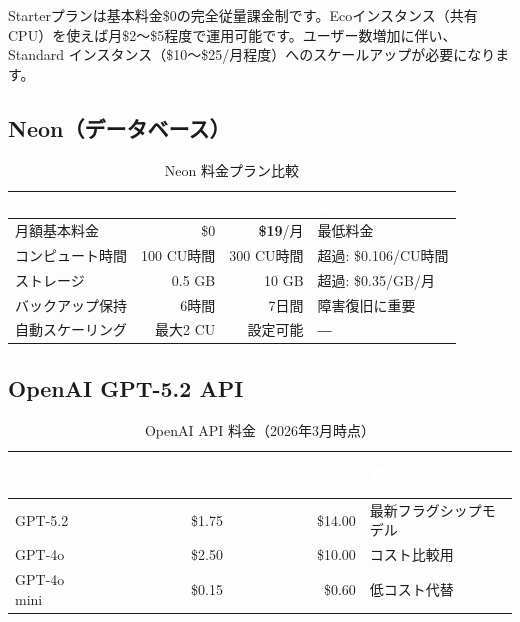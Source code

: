 \documentclass[a4paper,11pt]{ltjsarticle}
\begin{document}
\begin{infobox}[Koyebのコストポイント]
Starterプランは基本料金\$0の完全従量課金制です。Ecoインスタンス（共有CPU）を使えば月\$2〜\$5程度で運用可能です。ユーザー数増加に伴い、Standard インスタンス（\$10〜\$25/月程度）へのスケールアップが必要になります。
\end{infobox}

\subsection{Neon（データベース）}

\begin{table}[H]
\centering
\caption{Neon 料金プラン比較}
\begin{tabularx}{\textwidth}{lrrX}
\toprule
\rowcolor{headerblue}\textcolor{white}{\textbf{項目}} & \textcolor{white}{\textbf{Free}} & \textcolor{white}{\textbf{Launch}} & \textcolor{white}{\textbf{備考}} \\
\midrule
月額基本料金 & \$0 & \textbf{\$19}/月 & 最低料金 \\
\rowcolor{lightgray}
コンピュート時間 & 100 CU時間 & 300 CU時間 & 超過: \$0.106/CU時間 \\
ストレージ & 0.5 GB & 10 GB & 超過: \$0.35/GB/月 \\
\rowcolor{lightgray}
バックアップ保持 & 6時間 & 7日間 & 障害復旧に重要 \\
自動スケーリング & 最大2 CU & 設定可能 & ― \\
\bottomrule
\end{tabularx}
\end{table}

\subsection{OpenAI GPT-5.2 API}

\begin{table}[H]
\centering
\caption{OpenAI API 料金（2026年3月時点）}
\begin{tabularx}{\textwidth}{lrrX}
\toprule
\rowcolor{headerblue}\textcolor{white}{\textbf{モデル}} & \textcolor{white}{\textbf{入力/100万トークン}} & \textcolor{white}{\textbf{出力/100万トークン}} & \textcolor{white}{\textbf{備考}} \\
\midrule
GPT-5.2 & \$1.75 & \$14.00 & 最新フラグシップモデル \\
\rowcolor{lightgray}
GPT-4o & \$2.50 & \$10.00 & コスト比較用 \\
GPT-4o mini & \$0.15 & \$0.60 & 低コスト代替 \\
\bottomrule
\end{tabularx}
\end{table}
\end{document}
